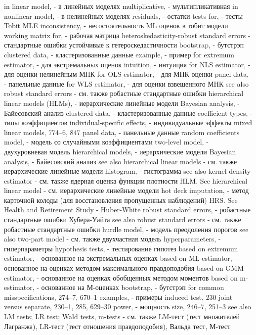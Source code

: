 in linear model, - в линейных моделях 
multiplicative, - мультипликативная
in nonlinear model, - в нелинейных моделях 
residuals, - остатки
tests for, - тесты
Tobit MLE inconsistency, - несостоятельность ML оценок в тобит модели 
working matrix for, - рабочая матрица
heteroskedasticity-robust standard errors - стандартные ошибки устойчивые к гетероскедастичности
bootstrap, - бутстрэп
clustered data, - кластеризованные данные
example, - пример
for extremum estimator, - для экстремальных оценок
intuition, - интуиция
for NLS estimator, - для оценки нелинейным МНК
for OLS estimator, - для МНК оценки 
panel data, - панельные данные
for WLS estimator, - для оценки взвешенного МНК
see also robust standard errors - см. также робастные стандартные ошибки
hierarchical linear models (HLMs), - иерархические линейные модели
Bayesian analysis, - Байесовский анализ
clustered data, - кластеризованные данные
coefficient types, - типы коэффициентов 
individual-specific effects, - индивидуальные эффекты 
mixed linear models, 774–6, 847 
panel data, - панельные данные
random coefficients model, - модель со случайными коэффициентами 
two-level model, - двухуровневая модель 
hierarchical models, - иерархические модели
Bayesian analysis, - Байесовский анализ 
see also hierarchical linear models - см. также иерархические линейные модели
histogram, - гистограмма
see also kernel density estimator - см. также ядерная оценка функции плотности
HLM. See hierarchical linear model - см. иерархические линейные модели
hot deck imputation, - метод карточной колоды (для восстановления пропущенных наблюдений)
HRS. See Health and Retirement Study - 
Huber-White robust standard errors, - робастные стандартные ошибки Хубера-Уайта
see also robust standard errors - см. также робастные стандартные ошибки
hurdle model, - модель преодоления порогов
see also two-part model - см. также двухчастная модель
hyperparameters, - гиперпараметры 
hypothesis tests, - тестирование гипотез
based on extremum estimator, - основанное на экстремальных оценках
based on ML estimator, - основанное на оценках методом максимального правдоподобия
based on GMM estimator, - основанное на оценках обобщенных методом моментов
based on m-estimator, - основанное на М-оценках
bootstrap, - бутстрэп
for common misspecifications, 274–7, 670–1 
examples, - примеры 
induced test, 230
joint versus separate, 230–1, 285, 629–30 
power, - мощность
size, 246–7, 251–3
see also LM tests; LR test; Wald tests, m-tests - см. также LM-тест (тест множителей Лагранжа), LR-тест (тест отношения правдоподобия), Вальда тест, М-тест

